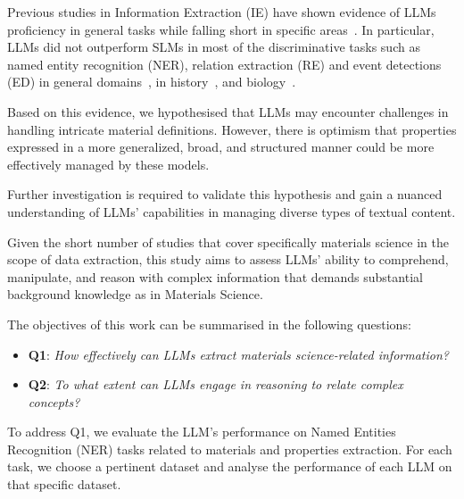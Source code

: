 Previous studies in Information Extraction (IE) have shown evidence of LLMs proficiency in general tasks while falling short in specific areas~\cite{kokon2023chatgpt}. 
In particular, LLMs did not outperform SLMs in most of the discriminative tasks such as named entity recognition (NER), relation extraction (RE) and event detections (ED) in general domains~\cite{ma2023large}, in history~\cite{gonzalez2023yes}, and biology~\cite{moradi2022gpt3}.

Based on this evidence, we hypothesised that LLMs may encounter challenges in handling intricate material definitions. However, there is optimism that properties expressed in a more generalized, broad, and structured manner could be more effectively managed by these models. 

Further investigation is required to validate this hypothesis and gain a nuanced understanding of LLMs' capabilities in managing diverse types of textual content.




Given the short number of studies that cover specifically materials science in the scope of data extraction, this study aims to assess LLMs' ability to comprehend, manipulate, and reason with complex information that demands substantial background knowledge as in Materials Science. 

The objectives of this work can be summarised in the following questions: 
\begin{itemize}
    \item \textbf{Q1}: \textit{How effectively can LLMs extract materials science-related information?}
    \item \textbf{Q2}: \textit{To what extent can LLMs engage in reasoning to relate complex concepts?}
\end{itemize}




To address Q1, we evaluate the LLM's performance on Named Entities Recognition (NER) tasks related to materials and properties extraction.
For each task, we choose a pertinent dataset and analyse the performance of each LLM on that specific dataset.


